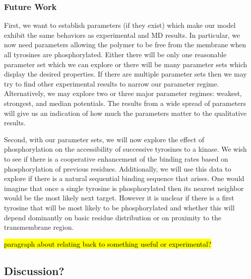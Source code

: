 \documentclass[../../AdvancementSummary.tex]{subfiles}
\begin{document}
\subsubsection{Future Work}

First, we want to establish parameters (if they exist) which make our model exhibit the same behaviors as experimental and MD results. In particular, we now need parameters allowing the polymer to be free from the membrane when all tyrosines are phosphorylated. Either there will be only one reasonable parameter set which we can explore or there will be many parameter sets which display the desired properties.  If there are multiple parameter sets then we may try to find other experimental results to narrow our parameter regime. Alternatively, we may explore two or three major parameter regimes: weakest, strongest, and median potentials. The results from a wide spread of parameters will give us an indication of how much the parameters matter to the qualitative results.  

Second, with our parameter sets, we will now explore the effect of phosphorylation on the accessibility of successive tyrosines to a kinase.  We wish to see if there is a cooperative enhancement of the binding rates based on phosphorylation of previous residues.  Additionally, we will use this data to explore if there is a natural sequential binding sequence that arises.  One would imagine that once a single tyrosine is phosphorylated then its nearest neighbor would be the most likely next target.  However it is unclear if there is a first tyrosine that will be most likely to be phosphorylated and whether this will depend dominantly on basic residue distribution or on proximity to the transmembrane region.

\hl{paragraph about relating back to something useful or experimental?}



\subsection{Discussion?}

























\end{document}
